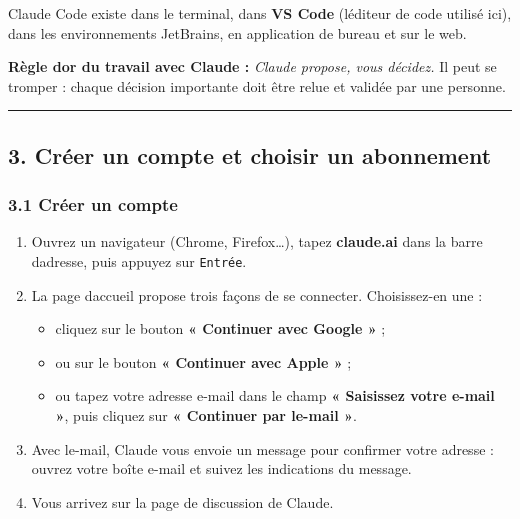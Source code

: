 \documentclass[
  french,
  11pt,
  a4paper,
]{article}
\providecommand{\tightlist}{%
  \setlength{\itemsep}{0pt}\setlength{\parskip}{0pt}}
\begin{document}
Claude Code existe dans le terminal, dans \textbf{VS Code}
(l\textquotesingle éditeur de code utilisé ici), dans les environnements
JetBrains, en application de bureau et sur le web.

\textbf{Règle d\textquotesingle or du travail avec Claude :}
\emph{Claude propose, vous décidez.} Il peut se tromper : chaque
décision importante doit être relue et validée par une personne.

\begin{center}\rule{0.5\linewidth}{0.5pt}\end{center}

\subsection{3. Créer un compte et choisir un
abonnement}\label{3-cruxe9er-un-compte-et-choisir-un-abonnement}

\subsubsection{3.1 Créer un compte}\label{31-cruxe9er-un-compte}

\begin{enumerate}
\def\labelenumi{\arabic{enumi}.}
\tightlist
\item
  Ouvrez un navigateur (Chrome, Firefox\ldots), tapez \textbf{claude.ai}
  dans la barre d\textquotesingle adresse, puis appuyez sur
  \texttt{Entrée}.
\item
  La page d\textquotesingle accueil propose trois façons de se
  connecter. Choisissez-en une :

  \begin{itemize}
  \tightlist
  \item
    cliquez sur le bouton \textbf{« Continuer avec Google »} ;
  \item
    ou sur le bouton \textbf{« Continuer avec Apple »} ;
  \item
    ou tapez votre adresse e-mail dans le champ \textbf{« Saisissez
    votre e-mail »}, puis cliquez sur \textbf{« Continuer par
    l\textquotesingle e-mail »}.
  \end{itemize}
\item
  Avec l\textquotesingle e-mail, Claude vous envoie un message pour
  confirmer votre adresse : ouvrez votre boîte e-mail et suivez les
  indications du message.
\item
  Vous arrivez sur la page de discussion de Claude.
\end{enumerate}
\end{document}
